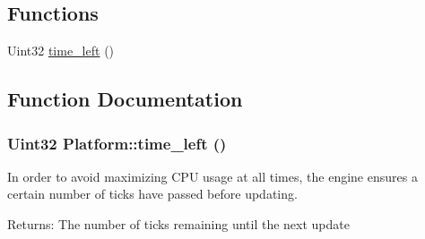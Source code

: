 \subsection*{Functions}
\begin{CompactItemize}
\item 
Uint32 \hyperlink{namespace_platform_40ff14ee8e074316bf2840ae9ee0179e}{time\_\-left} ()
\end{CompactItemize}


\subsection{Function Documentation}
\hypertarget{namespace_platform_40ff14ee8e074316bf2840ae9ee0179e}{
\subsubsection[{time\_\-left}]{\setlength{\rightskip}{0pt plus 5cm}Uint32 Platform::time\_\-left ()}}
\label{dc/d0e/namespace_platform_40ff14ee8e074316bf2840ae9ee0179e}


In order to avoid maximizing CPU usage at all times, the engine ensures a certain number of ticks have passed before updating.

\begin{Desc}
\item[Returns:]The number of ticks remaining until the next update \end{Desc}
